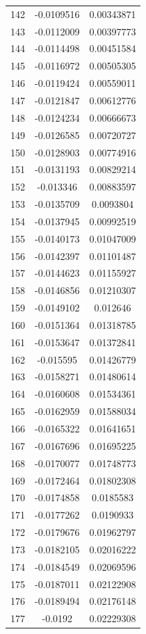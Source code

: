 \documentclass[a4paper, 11pt, oneside]{report}
\begin{document}
{\begin{longtable}{|c|c|c|}
142 & -0.0109516 & 0.00343871 \\
143 & -0.0112009 & 0.00397773 \\
144 & -0.0114498 & 0.00451584 \\
145 & -0.0116972 & 0.00505305 \\
146 & -0.0119424 & 0.00559011 \\
147 & -0.0121847 & 0.00612776 \\
148 & -0.0124234 & 0.00666673 \\
149 & -0.0126585 & 0.00720727 \\
150 & -0.0128903 & 0.00774916 \\
151 & -0.0131193 & 0.00829214 \\
152 & -0.013346  & 0.00883597 \\
153 & -0.0135709 & 0.0093804  \\
154 & -0.0137945 & 0.00992519 \\
155 & -0.0140173 & 0.01047009 \\
156 & -0.0142397 & 0.01101487 \\
157 & -0.0144623 & 0.01155927 \\
158 & -0.0146856 & 0.01210307 \\
159 & -0.0149102 & 0.012646   \\
160 & -0.0151364 & 0.01318785 \\
161 & -0.0153647 & 0.01372841 \\
162 & -0.015595  & 0.01426779 \\
163 & -0.0158271 & 0.01480614 \\
164 & -0.0160608 & 0.01534361 \\
165 & -0.0162959 & 0.01588034 \\
166 & -0.0165322 & 0.01641651 \\
167 & -0.0167696 & 0.01695225 \\
168 & -0.0170077 & 0.01748773 \\
169 & -0.0172464 & 0.01802308 \\
170 & -0.0174858 & 0.0185583  \\
171 & -0.0177262 & 0.0190933  \\
172 & -0.0179676 & 0.01962797 \\
173 & -0.0182105 & 0.02016222 \\
174 & -0.0184549 & 0.02069596 \\
175 & -0.0187011 & 0.02122908 \\
176 & -0.0189494 & 0.02176148 \\
177 & -0.0192    & 0.02229308 \\

\end{longtable}}
\end{document}
